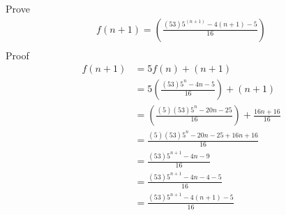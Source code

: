 \documentclass{article}
\begin{document}
\begin{enumerate}
  Prove
  \begin{align*}
    f(n+1) =  (\frac{ (53)5^(n + 1)   - 4(n+1) - 5 }{ 16})  \\
  \end{align*}
  Proof
  \begin{align*}
    f(n+1) &=  5f(n) + (n + 1)  \\
    &=  5 (\frac{ (53)5^n   - 4n - 5 }{ 16}) + (n + 1)  \\
    &=   (\frac{ (5)(53)5^n   - 20n - 25 }{ 16}) + \frac{16n + 16}{16} \\
    &=   \frac{ (5)(53)5^n   - 20n - 25 + 16n + 16 }{ 16} \\
    &=   \frac{ (53)5^{n+1}   - 4n - 9 }{ 16} \\
    &=   \frac{ (53)5^{n+1}   - 4n - 4 - 5  }{ 16} \\
    &=   \frac{ (53)5^{n+1}   - 4(n + 1) - 5  }{ 16} \\
  \end{align*}

\end{enumerate}
\end{document}
